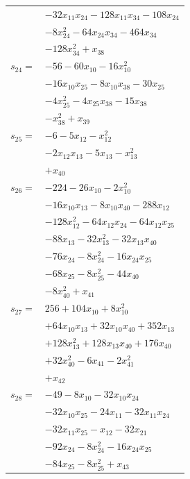 \begin{longtable}{@{}r@{\;}l@{}}
 & \(\displaystyle -32x_{11}x_{24} -128x_{11}x_{34} -108x_{24}\) \\
 & \(\displaystyle -8x_{24}^{2} -64x_{24}x_{34} -464x_{34}\) \\
 & \(\displaystyle -128x_{34}^{2} +x_{38}\) \\[3pt]
\(s_{24}=\) & \(\displaystyle -56 -60x_{10} -16x_{10}^{2}\) \\
 & \(\displaystyle -16x_{10}x_{25} -8x_{10}x_{38} -30x_{25}\) \\
 & \(\displaystyle -4x_{25}^{2} -4x_{25}x_{38} -15x_{38}\) \\
 & \(\displaystyle -x_{38}^{2} +x_{39}\) \\[3pt]
\(s_{25}=\) & \(\displaystyle -6 -5x_{12} -x_{12}^{2}\) \\
 & \(\displaystyle -2x_{12}x_{13} -5x_{13} -x_{13}^{2}\) \\
 & \(\displaystyle +x_{40}\) \\[3pt]
\(s_{26}=\) & \(\displaystyle -224 -26x_{10} -2x_{10}^{2}\) \\
 & \(\displaystyle -16x_{10}x_{13} -8x_{10}x_{40} -288x_{12}\) \\
 & \(\displaystyle -128x_{12}^{2} -64x_{12}x_{24} -64x_{12}x_{25}\) \\
 & \(\displaystyle -88x_{13} -32x_{13}^{2} -32x_{13}x_{40}\) \\
 & \(\displaystyle -76x_{24} -8x_{24}^{2} -16x_{24}x_{25}\) \\
 & \(\displaystyle -68x_{25} -8x_{25}^{2} -44x_{40}\) \\
 & \(\displaystyle -8x_{40}^{2} +x_{41}\) \\[3pt]
\(s_{27}=\) & \(\displaystyle 256 +104x_{10} +8x_{10}^{2}\) \\
 & \(\displaystyle +64x_{10}x_{13} +32x_{10}x_{40} +352x_{13}\) \\
 & \(\displaystyle +128x_{13}^{2} +128x_{13}x_{40} +176x_{40}\) \\
 & \(\displaystyle +32x_{40}^{2} -6x_{41} -2x_{41}^{2}\) \\
 & \(\displaystyle +x_{42}\) \\[3pt]
\(s_{28}=\) & \(\displaystyle -49 -8x_{10} -32x_{10}x_{24}\) \\
 & \(\displaystyle -32x_{10}x_{25} -24x_{11} -32x_{11}x_{24}\) \\
 & \(\displaystyle -32x_{11}x_{25} -x_{12} -32x_{21}\) \\
 & \(\displaystyle -92x_{24} -8x_{24}^{2} -16x_{24}x_{25}\) \\
 & \(\displaystyle -84x_{25} -8x_{25}^{2} +x_{43}\) \\[3pt]

\end{longtable}
